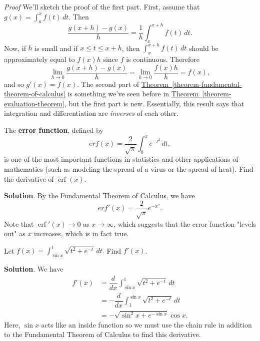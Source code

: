\documentclass[10pt,]{book}
\makeatletter
\newcommand{\terminology}[1]{\textbf{#1}}
\theoremstyle{ptxplainnotitle}
\theoremstyle{ptxplaintitle}
\theoremstyle{ptxplainnotitle}
\theoremstyle{ptxplaintitle}
\theoremstyle{ptxplainnotitle}
\theoremstyle{ptxplaintitle}
\renewcommand*{\proofname}{Proof}
\renewenvironment{proof}[1][\proofname]{\par
  \pushQED{\qed}%
  \normalfont \topsep6\p@\@plus6\p@\relax
  \trivlist
  \item\relax
    {\itshape
    #1\@addpunct{.}}\hspace\labelsep\ignorespaces
}{%
  \popQED\endtrivlist\@endpefalse
}
\theoremstyle{ptxdefinitionnotitle}
\theoremstyle{ptxdefinitiontitle}
\theoremstyle{ptxdefinitionnotitle}
\theoremstyle{ptxdefinitiontitle}
\theoremstyle{ptxdefinitionnotitle}
\theoremstyle{ptxdefinitiontitle}
\theoremstyle{ptxdefinitionnotitle}
\theoremstyle{ptxdefinitiontitle}
\theoremstyle{ptxdefinitionnotitle}
\theoremstyle{ptxdefinitiontitle}
\numberwithin{equation}{section}
\newcommand{\dv}[3][]{\dfrac{d^{#1} #2}{d #3^{#1}}}
\newcommand{\erf}[1]{\operatorname{erf} #1}
\makeatother
\begin{document}
\begin{proof}\hypertarget{proof-11}{}
\hypertarget{p-467}{}%
We'll sketch the proof of the first part. First, assume that \(g(x) = \int_{a}^{x}f(t)\,dt\). Then%
\begin{equation*}
\frac{g(x+h)-g(x)}{h} = \frac{1}{h}\int_{x}^{x+h}f(t)\,dt.
\end{equation*}
Now, if \(h\) is small and if \(x\leq t\leq x+h\), then \(\int_{x}^{x+h}f(t)\,dt\) should be approximately equal to \(f(x)h\) since \(f\) is continuous. Therefore%
\begin{equation*}
\lim_{h\to0}\frac{g(x+h)-g(x)}{h} = \lim_{h\to0}\frac{f(x)h}{h} = f(x),
\end{equation*}
and so \(g'(x) = f(x)\).%
\end{proof}
\hypertarget{p-468}{}%
The second part of \hyperref[theorem-fundamental-theorem-of-calculus]{Theorem~\ref{theorem-fundamental-theorem-of-calculus}} is something we've seen before in \hyperref[theorem-evaluation-theorem]{Theorem~\ref{theorem-evaluation-theorem}}, but the first part is new. Essentially, this result says that integration and differentiation are \emph{inverses} of each other.%
\begin{example}\label{example-error-function}
\hypertarget{p-469}{}%
The \terminology{error function}, defined by%
\begin{equation*}
erf(x) = \frac{2}{\sqrt{\pi}}\int_{0}^{x}e^{-t^{2}}\,dt,
\end{equation*}
is one of the most important functions in statistics and other applications of mathematics (such as modeling the spread of a virus or the spread of heat). Find the derivative of \(\erf(x)\).%
\par\smallskip%
\noindent\textbf{Solution}.\hypertarget{solution-102}{}\quad%
\hypertarget{p-470}{}%
By the Fundamental Theorem of Calculus, we have%
\begin{equation*}
erf'(x) = \frac{2}{\sqrt{\pi}}e^{-x^{2}}.
\end{equation*}
Note that \(\erf'(x)\to0\) as \(x\to\infty\), which suggests that the error function "levels out" as \(x\) increases, which is in fact true.%
\end{example}
\begin{example}\label{example-computing-derivatives}
\hypertarget{p-471}{}%
Let \(f(x) = \int_{\sin x}^{1}\sqrt{t^{2} + e^{-t}}\,dt.\) Find \(f'(x)\).%
\par\smallskip%
\noindent\textbf{Solution}.\hypertarget{solution-103}{}\quad%
\hypertarget{p-472}{}%
We have%
\begin{align*}
f'(x) & = \dv{}{x}\int_{\sin x}^{1}\sqrt{t^{2} + e^{-t}}\,dt \\
& = -\dv{}{x}\int_{1}^{\sin x}\sqrt{t^{2} + e^{-t}}\,dt \\
& = -\sqrt{\sin^{2}x+e^{-\sin x}}\cos x. 
\end{align*}
Here, \(\sin x\) acts like an inside function so we must use the chain rule in addition to the Fundamental Theorem of Calculus to find this derivative.%
\end{example}
\end{document}
